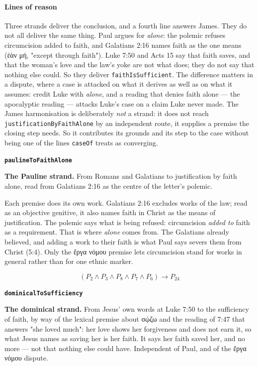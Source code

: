 \documentclass[11pt]{article}
\begin{document}
\paragraph*{Lines of reason}
\leavevmode\par
Three strands deliver the conclusion, and a fourth line answers James. They do not all deliver the same thing. Paul argues for \emph{alone}: the polemic refuses circumcision added to faith, and Galatians 2:16 names faith as the one means (ἐὰν μή, "except through faith"). Luke 7:50 and Acts 15 say that faith saves, and that the woman's love and the law's yoke are not what does; they do not say that nothing else could. So they deliver \texttt{faith\allowbreak{}Is\allowbreak{}Sufficient}. The difference matters in a dispute, where a case is attacked on what it derives as well as on what it assumes: credit Luke with \emph{alone}, and a reading that denies faith alone — the apocalyptic reading — attacks Luke's case on a claim Luke never made. The James harmonisation is deliberately \emph{not} a strand: it does not reach \texttt{justification\allowbreak{}By\allowbreak{}Faith\allowbreak{}Alone} by an independent route, it supplies a premise the closing step needs. So it contributes its grounds and its step to the case without being one of the lines \texttt{case\allowbreak{}Of} treats as converging.

\par\medskip\noindent\textbf{\texttt{pauline\allowbreak{}To\allowbreak{}Faith\allowbreak{}Alone}}\par\nobreak\noindent
\textbf{The Pauline strand.} From Romans and Galatians to justification by faith alone, read from Galatians 2:16 as the centre of the letter's polemic.

Each premise does its own work. Galatians 2:16 excludes works of the law; read as an objective genitive, it also names faith in Christ as the means of justification. The polemic says what is being refused: circumcision \emph{added to} faith as a requirement. That is where \emph{alone} comes from. The Galatians already believed, and adding a work to their faith is what Paul says severs them from Christ (5:4). Only the ἔργα νόμου premise lets circumcision stand for works in general rather than for one ethnic marker.

\[(P_{2} \land P_{3} \land P_{8} \land P_{7} \land P_{6}) \rightarrow P_{24}\]
\par\medskip\noindent\textbf{\texttt{dominical\allowbreak{}To\allowbreak{}Sufficiency}}\par\nobreak\noindent
\textbf{The dominical strand.} From Jesus' own words at Luke 7:50 to the sufficiency of faith, by way of the lexical premise about σῴζω and the reading of 7:47 that answers "she loved much": her love shows her forgiveness and does not earn it, so what Jesus names as saving her is her faith. It says her faith saved her, and no more — not that nothing else could have. Independent of Paul, and of the ἔργα νόμου dispute.
\end{document}
